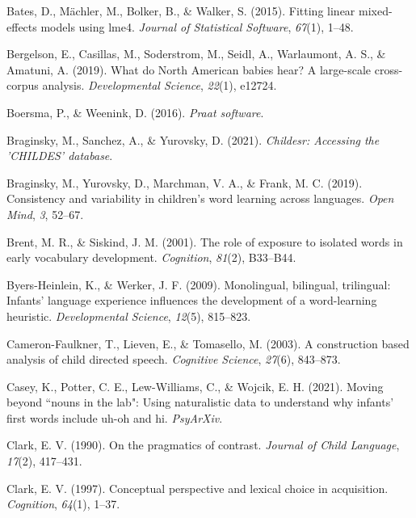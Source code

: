 \documentclass[10pt, letterpaper]{article}
\newenvironment{CSLReferences}%
  {}%
  {\par}
\begin{document}
\hypertarget{refs}{}
\begin{CSLReferences}
\leavevmode\hypertarget{ref-bates2015fitting}{}%
Bates, D., Mächler, M., Bolker, B., \& Walker, S. (2015). Fitting linear
mixed-effects models using {lme4}. \emph{Journal of Statistical
Software}, \emph{67}(1), 1--48.

\leavevmode\hypertarget{ref-bergelson2019north}{}%
Bergelson, E., Casillas, M., Soderstrom, M., Seidl, A., Warlaumont, A.
S., \& Amatuni, A. (2019). What do {North American} babies hear? A
large-scale cross-corpus analysis. \emph{Developmental Science},
\emph{22}(1), e12724.

\leavevmode\hypertarget{ref-boersma2016praat}{}%
Boersma, P., \& Weenink, D. (2016). \emph{Praat software}.

\leavevmode\hypertarget{ref-braginsky2021childesr}{}%
Braginsky, M., Sanchez, A., \& Yurovsky, D. (2021). \emph{Childesr:
Accessing the 'CHILDES' database}.

\leavevmode\hypertarget{ref-braginsky2019consistency}{}%
Braginsky, M., Yurovsky, D., Marchman, V. A., \& Frank, M. C. (2019).
Consistency and variability in children's word learning across
languages. \emph{Open Mind}, \emph{3}, 52--67.

\leavevmode\hypertarget{ref-brent2001role}{}%
Brent, M. R., \& Siskind, J. M. (2001). The role of exposure to isolated
words in early vocabulary development. \emph{Cognition}, \emph{81}(2),
B33--B44.

\leavevmode\hypertarget{ref-byers2009monolingual}{}%
Byers-Heinlein, K., \& Werker, J. F. (2009). Monolingual, bilingual,
trilingual: Infants' language experience influences the development of a
word-learning heuristic. \emph{Developmental Science}, \emph{12}(5),
815--823.

\leavevmode\hypertarget{ref-cameron2003construction}{}%
Cameron-Faulkner, T., Lieven, E., \& Tomasello, M. (2003). A
construction based analysis of child directed speech. \emph{Cognitive
Science}, \emph{27}(6), 843--873.

\leavevmode\hypertarget{ref-caseyURmoving}{}%
Casey, K., Potter, C. E., Lew-Williams, C., \& Wojcik, E. H. (2021).
Moving beyond ``nouns in the lab": Using naturalistic data to understand
why infants' first words include uh-oh and hi. \emph{PsyArXiv}.

\leavevmode\hypertarget{ref-clark1990pragmatics}{}%
Clark, E. V. (1990). On the pragmatics of contrast. \emph{Journal of
Child Language}, \emph{17}(2), 417--431.

\leavevmode\hypertarget{ref-clark1997conceptual}{}%
Clark, E. V. (1997). Conceptual perspective and lexical choice in
acquisition. \emph{Cognition}, \emph{64}(1), 1--37.


\end{CSLReferences}
\end{document}
